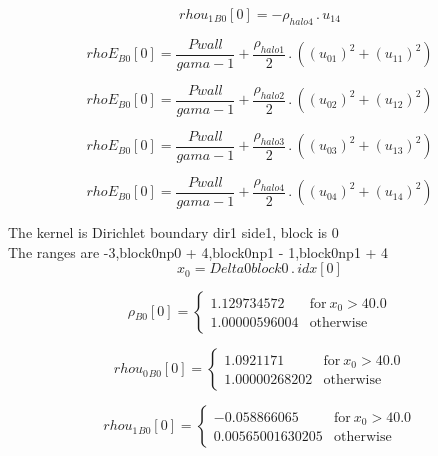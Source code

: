 \documentclass{article}
\begin{document}
\begin{dmath}{rhou_{1}{_{B0}}}[{0}] = - \rho_{halo 4} \,.\, u_{14}\end{dmath}

\begin{dmath}{rhoE{_{B0}}}[{0}] = \frac{Pwall}{gama - 1} + \frac{\rho_{halo 1}}{2} \,.\, \left(\left(u_{01} \right)^{2} + \left(u_{11} \right)^{2}\right)\end{dmath}

\begin{dmath}{rhoE{_{B0}}}[{0}] = \frac{Pwall}{gama - 1} + \frac{\rho_{halo 2}}{2} \,.\, \left(\left(u_{02} \right)^{2} + \left(u_{12} \right)^{2}\right)\end{dmath}

\begin{dmath}{rhoE{_{B0}}}[{0}] = \frac{Pwall}{gama - 1} + \frac{\rho_{halo 3}}{2} \,.\, \left(\left(u_{03} \right)^{2} + \left(u_{13} \right)^{2}\right)\end{dmath}

\begin{dmath}{rhoE{_{B0}}}[{0}] = \frac{Pwall}{gama - 1} + \frac{\rho_{halo 4}}{2} \,.\, \left(\left(u_{04} \right)^{2} + \left(u_{14} \right)^{2}\right)\end{dmath}

\noindent The kernel is Dirichlet boundary dir1 side1, block is 0\\\noindent The ranges are -3,block0np0 + 4,block0np1 - 1,block0np1 + 4\\\begin{dmath}x_{0} = Delta0block0 \,.\, {idx}[{0}]\end{dmath}

\begin{dmath}{\rho{_{B0}}}[{0}] = \begin{cases} 1.129734572 & \text{for}\: x_{0} > 40.0 \\1.00000596004 & \text{otherwise} \end{cases}\end{dmath}

\begin{dmath}{rhou_{0}{_{B0}}}[{0}] = \begin{cases} 1.0921171 & \text{for}\: x_{0} > 40.0 \\1.00000268202 & \text{otherwise} \end{cases}\end{dmath}

\begin{dmath}{rhou_{1}{_{B0}}}[{0}] = \begin{cases} -0.058866065 & \text{for}\: x_{0} > 40.0 \\0.00565001630205 & \text{otherwise} \end{cases}\end{dmath}
\end{document}
